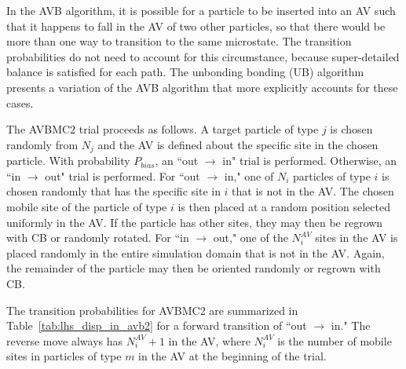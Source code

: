 In the AVB algorithm, it is possible for a particle to be inserted into an AV such that it happens to fall in the AV of two other particles, so that there would be more than one way to transition to the same microstate.
The transition probabilities do not need to account for this circumstance, because super-detailed balance is satisfied for each path.
The unbonding bonding (UB) algorithm \cite{wierzchowski_general-purpose_2001} presents a variation of the AVB algorithm that more explicitly accounts for these cases.

The AVBMC2 trial proceeds as follows.
A target particle of type $j$ is chosen randomly from $N_j$ and the AV is defined about the specific site in the chosen particle.
With probability $P_{bias}$, an ``out $\rightarrow$ in" trial is performed.
Otherwise, an ``in $\rightarrow$ out" trial is performed.
For ``out $\rightarrow$ in," one of $N_i$ particles of type $i$ is chosen randomly that has the specific site in $i$ that is not in the AV.
The chosen mobile site of the particle of type $i$ is then placed at a random position selected uniformly in the AV.
If the particle has other sites, they may then be regrown with CB or randomly rotated.
For ``in $\rightarrow$ out," one of the $N_i^{AV}$ sites in the AV is placed randomly in the entire simulation domain that is not in the AV.
Again, the remainder of the particle may then be oriented randomly or regrown with CB.

The transition probabilities for AVBMC2 are summarized in Table~\ref{tab:lhs_disp_in_avb2} for a forward transition of ``out $\rightarrow$ in."
The reverse move always has $N_i^{AV}+1$ in the AV, where $N_i^{AV}$ is the number of mobile sites in particles of type $m$ in the AV at the beginning of the trial.

